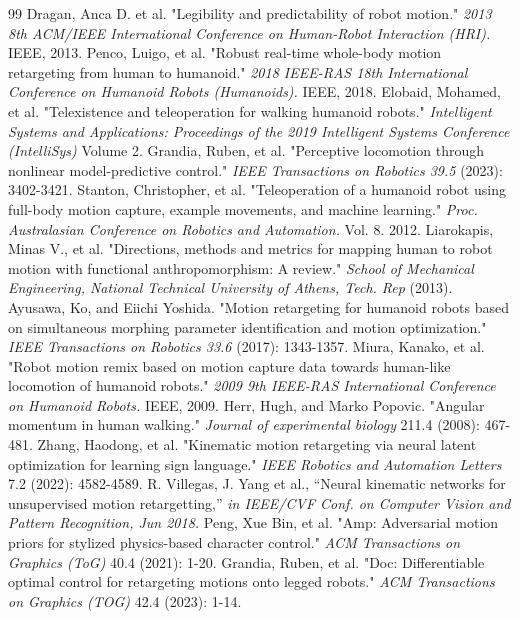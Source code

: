 \documentclass[a4paper, 10pt, conference]{ieeeconf}      %
\begin{document}
\begin{thebibliography}{99}
\vspace{-5pt}
 Dragan, Anca D. et al. "Legibility and predictability of robot motion." \textit{2013 8th ACM/IEEE International Conference on Human-Robot Interaction (HRI). }IEEE, 2013.
 Penco, Luigo, et al. "Robust real-time whole-body motion retargeting from human to humanoid." \textit{2018 IEEE-RAS 18th International Conference on Humanoid Robots (Humanoids).} IEEE, 2018.
 Elobaid, Mohamed, et al. "Telexistence and teleoperation for walking humanoid robots." \textit{Intelligent Systems and Applications: Proceedings of the 2019 Intelligent Systems Conference (IntelliSys)} Volume 2.
 Grandia, Ruben, et al. "Perceptive locomotion through nonlinear model-predictive control." \textit{IEEE Transactions on Robotics 39.5 }(2023): 3402-3421.
 Stanton, Christopher, et al. "Teleoperation of a humanoid robot using full-body motion capture, example movements, and machine learning." \textit{Proc. Australasian Conference on Robotics and Automation.} Vol. 8. 2012.
 Liarokapis, Minas V., et al. "Directions, methods and metrics for mapping human to robot motion with functional anthropomorphism: A review." \textit{School of Mechanical Engineering, National Technical University of Athens, Tech. Rep} (2013).
 Ayusawa, Ko, and Eiichi Yoshida. "Motion retargeting for humanoid robots based on simultaneous morphing parameter identification and motion optimization." \textit{IEEE Transactions on Robotics 33.6 }(2017): 1343-1357.
 Miura, Kanako, et al. "Robot motion remix based on motion capture data towards human-like locomotion of humanoid robots." \textit{2009 9th IEEE-RAS International Conference on Humanoid Robots.} IEEE, 2009.
 Herr, Hugh, and Marko Popovic. "Angular momentum in human walking." \textit{Journal of experimental biology }211.4 (2008): 467-481.
 Zhang, Haodong, et al. "Kinematic motion retargeting via neural latent optimization for learning sign language." \textit{IEEE Robotics and Automation Letters} 7.2 (2022): 4582-4589.
 R. Villegas, J. Yang et al., “Neural kinematic networks for unsupervised motion retargetting,” \textit{in IEEE/CVF Conf. on Computer Vision and Pattern Recognition, Jun 2018.}
 Peng, Xue Bin, et al. "Amp: Adversarial motion priors for stylized physics-based character control." \textit{ACM Transactions on Graphics (ToG)} 40.4 (2021): 1-20.
 Grandia, Ruben, et al. "Doc: Differentiable optimal control for retargeting motions onto legged robots." \textit{ACM Transactions on Graphics (TOG)} 42.4 (2023): 1-14.

\end{thebibliography}
\end{document}
